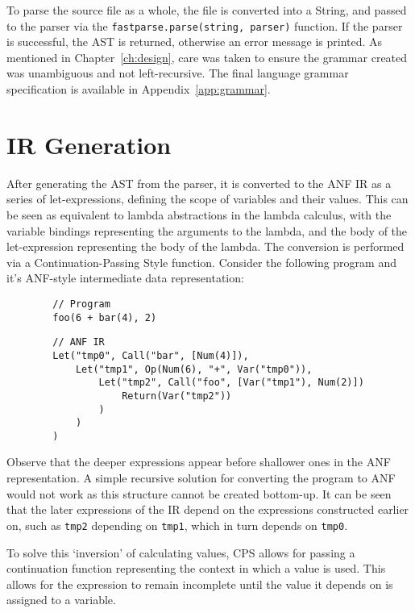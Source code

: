 To parse the source file as a whole, the file is converted into a String, and passed to the parser
via the \texttt{fastparse.parse(string, parser)} function. If the parser is successful,
the AST is returned, otherwise an error message is printed. As mentioned in
Chapter~\ref{ch:design}, care was taken to ensure the grammar created was unambiguous and not
left-recursive. The final language grammar specification is available in Appendix~\ref{app:grammar}.

\section{IR Generation}

After generating the AST from the parser, it is converted to the ANF IR as a series of
let-expressions, defining the scope of variables and their values. This can be seen as equivalent to
lambda abstractions in the lambda calculus, with the variable bindings representing the arguments to
the lambda, and the body of the let-expression representing the body of the lambda. The conversion
is performed via a Continuation-Passing Style function. Consider the following program and it's
ANF-style intermediate data representation:

\begin{tcolorbox}
    \begin{verbatim}
        // Program
        foo(6 + bar(4), 2)
    \end{verbatim}
    \tcblower
    \begin{verbatim}
        // ANF IR
        Let("tmp0", Call("bar", [Num(4)]),
            Let("tmp1", Op(Num(6), "+", Var("tmp0")),
                Let("tmp2", Call("foo", [Var("tmp1"), Num(2)])
                    Return(Var("tmp2"))
                )
            )
        )
    \end{verbatim}
\end{tcolorbox}

Observe that the deeper expressions appear before shallower ones in the ANF
representation. A simple recursive solution for converting the program to ANF would not work as this
structure cannot be created bottom-up. It can be seen that the later expressions of the IR depend on
the expressions constructed earlier on, such as \texttt{tmp2} depending on \texttt{tmp1}, which in
turn depends on \texttt{tmp0}.

To solve this `inversion' of calculating values, CPS allows for passing a continuation function
representing the context in which a value is used. This allows for the expression to remain
incomplete until the value it depends on is assigned to a variable.

